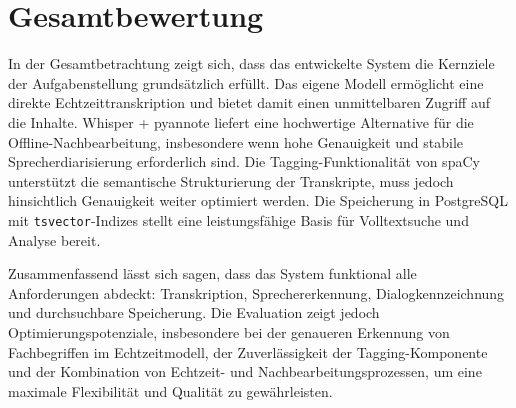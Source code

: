 \section{Gesamtbewertung}

In der Gesamtbetrachtung zeigt sich, dass das entwickelte System die Kernziele der
Aufgabenstellung grundsätzlich erfüllt. Das eigene Modell ermöglicht eine direkte
Echtzeittranskription und bietet damit einen unmittelbaren Zugriff auf die Inhalte.
Whisper + pyannote liefert eine hochwertige Alternative für die Offline-Nachbearbeitung,
insbesondere wenn hohe Genauigkeit und stabile Sprecherdiarisierung erforderlich sind. 
Die Tagging-Funktionalität von spaCy unterstützt die semantische Strukturierung der 
Transkripte, muss jedoch hinsichtlich Genauigkeit weiter optimiert werden. Die Speicherung
in PostgreSQL mit \texttt{tsvector}-Indizes stellt eine leistungsfähige Basis für
Volltextsuche und Analyse bereit.

Zusammenfassend lässt sich sagen, dass das System funktional alle Anforderungen 
abdeckt: Transkription, Sprechererkennung, Dialogkennzeichnung und durchsuchbare 
Speicherung. Die Evaluation zeigt jedoch Optimierungspotenziale, insbesondere bei der 
genaueren Erkennung von Fachbegriffen im Echtzeitmodell, der Zuverlässigkeit der Tagging-Komponente 
und der Kombination von Echtzeit- und Nachbearbeitungsprozessen, um eine maximale 
Flexibilität und Qualität zu gewährleisten.
